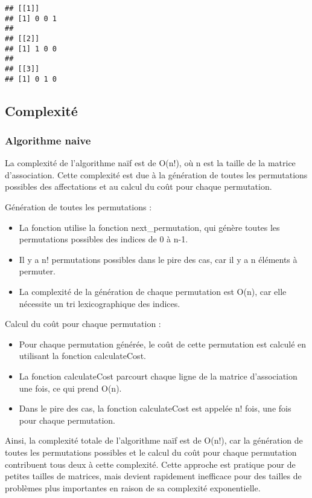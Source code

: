 \documentclass[
]{article}
\providecommand{\tightlist}{%
  \setlength{\itemsep}{0pt}\setlength{\parskip}{0pt}}
\begin{document}
\begin{verbatim}
## [[1]]
## [1] 0 0 1
## 
## [[2]]
## [1] 1 0 0
## 
## [[3]]
## [1] 0 1 0
\end{verbatim}

\hypertarget{complexituxe9}{%
\subsection{Complexité}\label{complexituxe9}}

\hypertarget{algorithme-naive}{%
\subsubsection{Algorithme naive}\label{algorithme-naive}}

La complexité de l'algorithme naïf est de O(n!), où n est la taille de
la matrice d'association. Cette complexité est due à la génération de
toutes les permutations possibles des affectations et au calcul du coût
pour chaque permutation.

Génération de toutes les permutations :

\begin{itemize}
\tightlist
\item
  La fonction utilise la fonction next\_permutation, qui génère toutes
  les permutations possibles des indices de 0 à n-1.
\item
  Il y a n! permutations possibles dans le pire des cas, car il y a n
  éléments à permuter.
\item
  La complexité de la génération de chaque permutation est O(n), car
  elle nécessite un tri lexicographique des indices.
\end{itemize}

Calcul du coût pour chaque permutation :

\begin{itemize}
\tightlist
\item
  Pour chaque permutation générée, le coût de cette permutation est
  calculé en utilisant la fonction calculateCost.
\item
  La fonction calculateCost parcourt chaque ligne de la matrice
  d'association une fois, ce qui prend O(n).
\item
  Dans le pire des cas, la fonction calculateCost est appelée n! fois,
  une fois pour chaque permutation.
\end{itemize}

Ainsi, la complexité totale de l'algorithme naïf est de O(n!), car la
génération de toutes les permutations possibles et le calcul du coût
pour chaque permutation contribuent tous deux à cette complexité. Cette
approche est pratique pour de petites tailles de matrices, mais devient
rapidement inefficace pour des tailles de problèmes plus importantes en
raison de sa complexité exponentielle.
\end{document}
